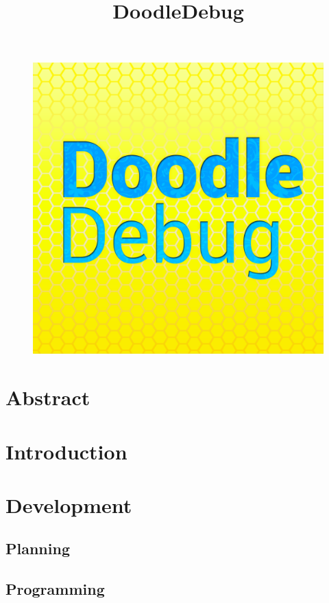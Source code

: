 \documentclass{report}
\title{DoodleDebug}
\begin{document}
\maketitle
\begin{figure}
	\includegraphics[scale=0.25]{img/DoodleDebug-logo.png}
\end{figure}

\chapter*{Abstract}

\chapter*{Introduction}

\chapter*{Development}
\section*{Planning}

\section*{Programming}
\end{document}
